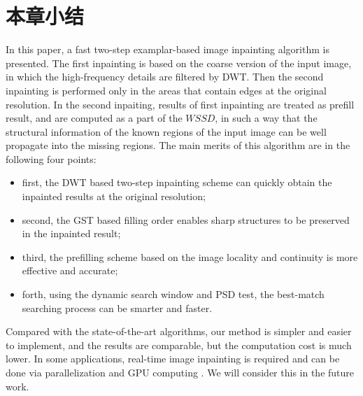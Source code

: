  \section{本章小结}
 \label{cha3:conclusions}
In this paper, a fast two-step examplar-based image inpainting algorithm is presented. The first inpainting is based on the coarse version of the input image, in which the high-frequency details are filtered by DWT. Then the second inpainting is performed only in the areas that contain edges at the original resolution. In the second inpaiting, results of first inpainting are treated as prefill result, and are computed as a part of the \(WSSD\), in such a way that the structural information of the known regions of the input image can be well propagate into the missing regions. The main merits of this algorithm are in the following four points:\begin{itemize}
                                \item first, the DWT based two-step inpainting scheme can quickly obtain the inpainted results at the original resolution;
                                \item second, the GST based filling order enables sharp structures to be preserved in the inpainted result;
                                \item third, the prefilling scheme based on the image locality and continuity is more effective and accurate;
                                \item forth, using the dynamic search window and PSD test, the best-match searching process can be smarter and faster.
                              \end{itemize}
Compared with the state-of-the-art algorithms, our method is simpler and easier to implement, and the results are comparable, but the computation cost is much lower. In some applications, real-time image inpainting is required and can be done via parallelization and GPU computing \cite{kwokFast}. We will consider this in the future work.